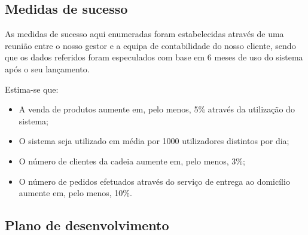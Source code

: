 
\subsection{Medidas de sucesso}
\label{sec:planeamento:medidas-sucesso}


As medidas de sucesso aqui enumeradas foram estabelecidas através de uma reunião entre o nosso gestor e a equipa de contabilidade do nosso cliente, sendo que os dados referidos foram especulados com base em 6 meses de uso do sistema após o seu lançamento.

Estima-se que:

\begin{itemize}
    
    \item A venda de produtos aumente em, pelo menos, 5\% através da utilização do sistema;
    
    \item O sistema seja utilizado em média por 1000 utilizadores distintos por dia;
    
    \item O número de clientes da cadeia aumente em, pelo menos, 3\%;
    
    

    \item O número de pedidos efetuados através do serviço de entrega ao domicílio aumente em, pelo menos, 10\%.

\end{itemize}


\subsection{Plano de desenvolvimento}
\label{sec:planeamento:plano-desenvolvimento}

